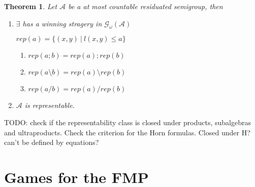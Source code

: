 \documentclass[a4paper]{article}
\theoremstyle{defin}
\theoremstyle{theorem}
\newtheorem{theorem}{Theorem}
\theoremstyle{claim}
\theoremstyle{prop}
\theoremstyle{lemma}
\theoremstyle{fact}
\theoremstyle{ex}
\theoremstyle{col}
\begin{document}
\begin{theorem}

Let $\mathcal{A}$ be a at most countable residuated semigroup, then

\begin{enumerate}
\item $\exists$ has a winning stragery in $\mathcal{G}_{\omega}(\mathcal{A})$

\begin{center}
$rep(a) = \{ (x,y) \: | \: l(x, y) \leq a \}$
\end{center}

\begin{enumerate}
\item $rep(a ; b) = rep(a) ; rep(b)$
\item $rep(a \setminus b) = rep(a) \setminus rep(b)$
\item $rep(a / b) = rep(a) / rep(b)$
\end{enumerate}

\item $\mathcal{A}$ is representable.
\end{enumerate}
\end{theorem}

TODO: check if the representability class is closed under products, subalgebras and ultraproducts. Check the criterion for the Horn formulas. Closed under H? can't be defined by equations?

\section{Games for the FMP}



\end{document}
